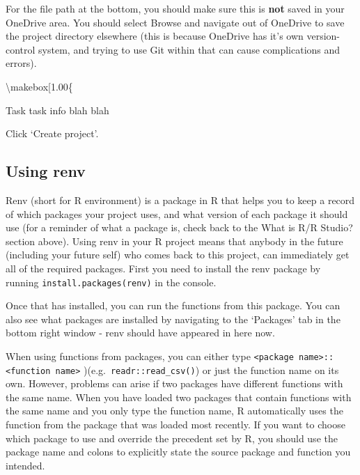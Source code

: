\documentclass[
  12pt,
]{article}
\begin{document}
For the file path at the bottom, you should make sure this is
\textbf{not} saved in your OneDrive area. You should select Browse and
navigate out of OneDrive to save the project directory elsewhere (this
is because OneDrive has it's own version-control system, and trying to
use Git within that can cause complications and errors).

\textbackslash makebox{[}1.00\linewidth{]}\{ \centering

\begin{tcolorbox}[colback=gssmidblue, 
 leftright skip=0.1cm,
 coltext=white, 
 halign=left, 
 fontupper={\Huge \bfseries},
 fontlower={\large \bfseries},
 sharp corners, 
 colframe=gssmidblue,
 width=0.49\linewidth,
 boxrule=0pt,
 equal height group=introbox
 ]
Task
\tcblower
task info blah blah 
\end{tcolorbox}

Click `Create project'.

\hypertarget{using-renv}{%
\subsection{Using renv}\label{using-renv}}

Renv (short for R environment) is a package in R that helps you to keep
a record of which packages your project uses, and what version of each
package it should use (for a reminder of what a package is, check back
to the What is R/R Studio? section above). Using renv in your R project
means that anybody in the future (including your future self) who comes
back to this project, can immediately get all of the required packages.
First you need to install the renv package by running
\texttt{install.packages(\textquotesingle{}renv\textquotesingle{})} in
the console.

Once that has installed, you can run the functions from this package.
You can also see what packages are installed by navigating to the
`Packages' tab in the bottom right window - renv should have appeared in
here now.

When using functions from packages, you can either type
\texttt{\textless{}package\ name\textgreater{}::\textless{}function\ name\textgreater{}}
)(e.g.~\texttt{readr::read\_csv()}) or just the function name on its
own. However, problems can arise if two packages have different
functions with the same name. When you have loaded two packages that
contain functions with the same name and you only type the function
name, R automatically uses the function from the package that was loaded
most recently. If you want to choose which package to use and override
the precedent set by R, you should use the package name and colons to
explicitly state the source package and function you intended.
\end{document}
